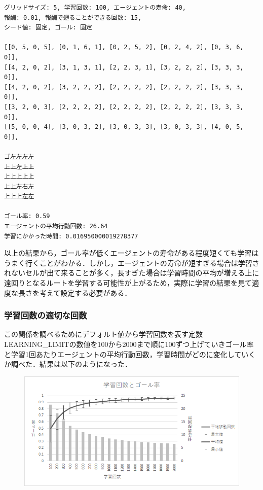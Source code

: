 \documentclass[a4j,11pt]{jarticle}
\begin{document}
\newpage

\begin{verbatim}
グリッドサイズ: 5, 学習回数: 100, エージェントの寿命: 40,
報酬: 0.01, 報酬で遡ることができる回数: 15,
シード値: 固定, ゴール: 固定

[[0, 5, 0, 5], [0, 1, 6, 1], [0, 2, 5, 2], [0, 2, 4, 2], [0, 3, 6, 0]],
[[4, 2, 0, 2], [3, 1, 3, 1], [2, 2, 3, 1], [3, 2, 2, 2], [3, 3, 3, 0]],
[[4, 2, 0, 2], [3, 2, 2, 2], [2, 2, 2, 2], [2, 2, 2, 2], [3, 3, 3, 0]],
[[3, 2, 0, 3], [2, 2, 2, 2], [2, 2, 2, 2], [2, 2, 2, 2], [3, 3, 3, 0]],
[[5, 0, 0, 4], [3, 0, 3, 2], [3, 0, 3, 3], [3, 0, 3, 3], [4, 0, 5, 0]],

ゴ左左左左
上上左上上
上上上上上
上上左右左
上上上左左

ゴール率: 0.59
エージェントの平均行動回数: 26.64
学習にかかった時間: 0.016950000019278377
\end{verbatim}

以上の結果から，ゴール率が低くエージェントの寿命がある程度短くても学習はうまく行くことがわかる．しかし，エージェントの寿命が短すぎる場合は学習されないセルが出て来ることが多く，長すぎた場合は学習時間の平均が増える上に遠回りとなるルートを学習する可能性が上がるため，実際に学習の結果を見て適度な長さを考えて設定する必要がある．

\newpage

\subsubsection{学習回数の適切な回数}

この関係を調べるためにデフォルト値から学習回数を表す定数LEARNING\_LIMITの数値を100から2000まで順に100ずつ上げていきゴール率と学習1回あたりエージェントの平均行動回数，学習時間がどのに変化していくか調べた．結果は以下のようになった．

\begin{figure}[ht]
  \begin{center}
    \includegraphics[scale=1.5]{img/changeLearningLimit.png}
  \end{center}
\end{figure}
\end{document}
